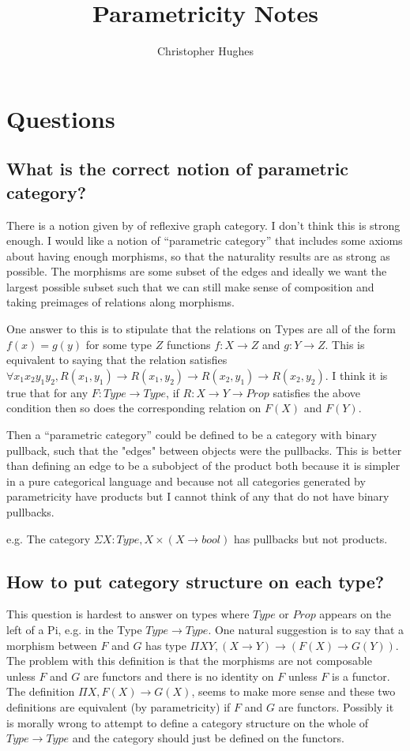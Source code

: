\documentclass[12pt]{article} %
\title{Parametricity Notes}
\author{Christopher Hughes}
\theoremstyle{definition}
\theoremstyle{definition}
\theoremstyle{definition}
\theoremstyle{definition}
\begin{document}
\section{Questions}

\subsection{What is the correct notion of parametric category?}

There is a notion given by \cite{Hermida2014LogicalRA} of reflexive graph category. 
I don't think this is strong enough. I would like a notion of ``parametric category'' that
includes some axioms about having enough morphisms, so that the naturality results are as strong as
possible. The morphisms are some subset of the edges and ideally we want the largest 
possible subset such that we can still make sense of composition and taking preimages of relations
along morphisms.

One answer to this is to stipulate that the relations on Types are all of the form $f(x) = g(y)$ for 
some type $Z$ functions $f : X \rightarrow Z$ and $g : Y \rightarrow Z$. This is equivalent to saying
that the relation satisfies $\forall x_1 x_2 y_1 y_2, R(x_1, y_1) \rightarrow R(x_1, y_2) 
\rightarrow R(x_2, y_1) \rightarrow R(x_2, y_2)$.
I think it is true that for any $F : Type \rightarrow Type$, if $R : X \rightarrow Y \rightarrow Prop$
satisfies the above condition then so does the corresponding relation on $F(X)$ and $F(Y)$.

Then a ``parametric category'' could be defined to be a category with binary pullback, such that 
the "edges" between objects were the pullbacks. This is better than defining an edge to be a subobject 
of the product both because it is simpler in a pure categorical language and because not all categories
generated by parametricity have products but I cannot think of any that do not have binary pullbacks.

e.g. The category $\Sigma X : Type, X \times (X \to bool)$ has pullbacks but not products. 


\subsection{How to put category structure on each type?}

This question is hardest to answer on types where $Type$ or $Prop$ appears on the left of a Pi,
e.g. in the Type $Type\rightarrow Type$. One natural suggestion is to say that a morphism between
$F$ and $G$ has type $\Pi X Y, (X \rightarrow Y) \rightarrow (F(X) \rightarrow G(Y))$. The problem 
with this definition is that the morphisms are not composable unless $F$ and $G$ are functors and 
there is no identity on $F$ unless $F$ is a functor. The definition $\Pi X, F(X) \rightarrow G(X)$,
seems to make more sense and these two definitions are equivalent (by parametricity) if $F$ and
$G$ are functors. Possibly it is morally wrong to attempt to define a category structure on the whole of
$Type \rightarrow Type$ and the category should just be defined on the functors.
\end{document}
